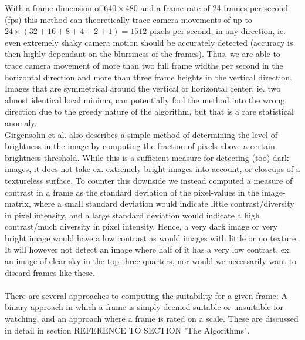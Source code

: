 %
With a frame dimension of $640\times480$ and a frame rate of 24 frames per second (fps) this method can theoretically trace camera movements of up to $24 \times (32+16+8+4+2+1) = 1512$ pixels per second, in any direction, ie. even extremely shaky camera motion should be accurately detected (accuracy is then highly dependant on the blurriness of the frames). Thus, we are able to trace camera movement of more than two full frame widths per second in the horizontal direction and more than three frame heights in the vertical direction. Images that are symmetrical around the vertical or horizontal center, ie. two almost identical local minima, can potentially fool the method into the wrong direction due to the greedy nature of the algorithm, but that is a rare statistical anomaly.\\
Girgensohn et al. \cite{Girgensohn:2000:SAH:354401.354415} also describes a simple method of determining the level of brightness in the image by computing the fraction of pixels above a certain brightness threshold. While this is a sufficient measure for detecting (too) dark images, it does not take ex. extremely bright images into account, or closeups of a textureless surface. To counter this downside we instead computed a measure of contrast in a frame as the standard deviation of the pixel-values in the image-matrix, where a small standard deviation would indicate little contrast/diversity in pixel intensity, and a large standard deviation would indicate a high contrast/much diversity in pixel intensity. Hence, a very dark image or very bright image would have a low contrast as would images with little or no texture. It will however not detect an image where half of it has a very low contrast, ex. an image of clear sky in the top three-quarters, nor would we necessarily want to discard frames like these.\\\\ %
There are several approaches to computing the suitability for a given frame: A binary approach in which a frame is simply deemed suitable or unsuitable for watching, and an approach where a frame is rated on a scale. These are discussed in detail in section REFERENCE TO SECTION "The Algorithms".
% 
%
